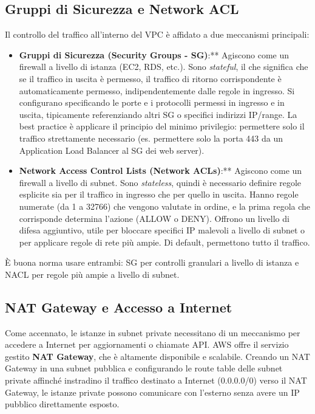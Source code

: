 \documentclass[a4paper,12pt]{report}
\begin{document}
\subsection{Gruppi di Sicurezza e Network ACL}
\label{subsec:sg-nacl}
Il controllo del traffico all'interno del VPC è affidato a due meccanismi principali:
\begin{itemize}
    \item \textbf{Gruppi di Sicurezza (Security Groups - SG)}:** Agiscono come un firewall a livello di istanza (EC2, RDS, etc.). Sono \textit{stateful}, il che significa che se il traffico in uscita è permesso, il traffico di ritorno corrispondente è automaticamente permesso, indipendentemente dalle regole in ingresso. Si configurano specificando le porte e i protocolli permessi in ingresso e in uscita, tipicamente referenziando altri SG o specifici indirizzi IP/range. La best practice è applicare il principio del minimo privilegio: permettere solo il traffico strettamente necessario (es. permettere solo la porta 443 da un Application Load Balancer al SG dei web server).
    \item \textbf{Network Access Control Lists (Network ACLs)}:** Agiscono come un firewall a livello di subnet. Sono \textit{stateless}, quindi è necessario definire regole esplicite sia per il traffico in ingresso che per quello in uscita. Hanno regole numerate (da 1 a 32766) che vengono valutate in ordine, e la prima regola che corrisponde determina l'azione (ALLOW o DENY). Offrono un livello di difesa aggiuntivo, utile per bloccare specifici IP malevoli a livello di subnet o per applicare regole di rete più ampie. Di default, permettono tutto il traffico.
\end{itemize}
È buona norma usare entrambi: SG per controlli granulari a livello di istanza e NACL per regole più ampie a livello di subnet.

\subsection{NAT Gateway e Accesso a Internet}
\label{subsec:nat-gateway}
Come accennato, le istanze in subnet private necessitano di un meccanismo per accedere a Internet per aggiornamenti o chiamate API. AWS offre il servizio gestito \textbf{NAT Gateway}, che è altamente disponibile e scalabile. Creando un NAT Gateway in una subnet pubblica e configurando le route table delle subnet private affinché instradino il traffico destinato a Internet (0.0.0.0/0) verso il NAT Gateway, le istanze private possono comunicare con l'esterno senza avere un IP pubblico direttamente esposto.
\end{document}
